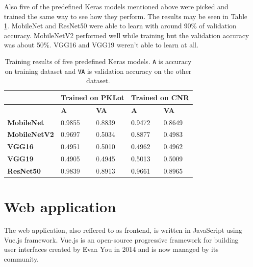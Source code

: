 \documentclass[thesis=M,english]{FITthesis}[2019/03/06]
\begin{document}
Also five of the predefined Keras models mentioned above were picked and trained the same way to see how they perform. The results may be seen in Table \ref{label:keras_models_results}. MobileNet and ResNet50 were able to learn with around 90\% of validation accuracy. MobileNetV2 performed well while training but the validation accuracy was about 50\%.  VGG16 and VGG19 weren't able to learn at all.

\begin{table}[ht!]
\centering
\caption{Training results of five predefined Keras models. \texttt{A} is accuracy on training dataset and \texttt{VA} is validation accuracy on the other dataset.}
\begin{tabular}{|l|l|l|l|l|}
\hline
                     & \multicolumn{2}{l|}{\textbf{Trained on PKLot}} & \multicolumn{2}{l|}{\textbf{Trained on CNR}} \\ \hline
\textbf{}            & \textbf{A}            & \textbf{VA}            & \textbf{A}           & \textbf{VA}           \\ \hline
\textbf{MobileNet}   & 0.9855                & 0.8839                 & 0.9472               & 0.8649                \\ \hline
\textbf{MobileNetV2} & 0.9697                & 0.5034                 & 0.8877               & 0.4983                \\ \hline
\textbf{VGG16}       & 0.4951                & 0.5010                 & 0.4962               & 0.4962                \\ \hline
\textbf{VGG19}       & 0.4905                & 0.4945                 & 0.5013               & 0.5009                \\ \hline
\textbf{ResNet50}    & 0.9839                & 0.8913                 & 0.9661               & 0.8965                \\ \hline
\end{tabular}
\label{label:keras_models_results}
\end{table}










\section{Web application}
The web application, also reffered to as frontend, is written in JavaScript using Vue.js framework. Vue.js is an open-source progressive framework for building user interfaces created by Evan You in 2014 and is now managed by its community. \\
\end{document}
